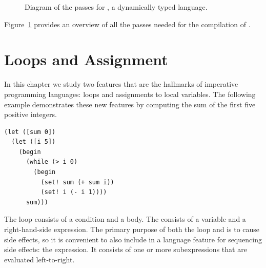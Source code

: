 \documentclass[11pt]{book}
\begin{document}
\begin{figure}[p]
  \caption{Diagram of the passes for \LangDyn{}, a dynamically typed language.}
\label{fig:Rdyn-passes}
\end{figure}

Figure~\ref{fig:Rdyn-passes} provides an overview of all the passes needed
for the compilation of \LangDyn{}.


\chapter{Loops and Assignment}
\label{ch:Rwhile}




In this chapter we study two features that are the hallmarks of
imperative programming languages: loops and assignments to local
variables. The following example demonstrates these new features by
computing the sum of the first five positive integers.
\begin{lstlisting}
(let ([sum 0])
  (let ([i 5])
    (begin
      (while (> i 0)
        (begin
          (set! sum (+ sum i))
          (set! i (- i 1))))
      sum)))
\end{lstlisting}
The  loop consists of a condition and a body.  
%
The  consists of a variable and a right-hand-side expression.
%
The primary purpose of both the  loop and   is
to cause side effects, so it is convenient to also include in a
language feature for sequencing side effects: the 
expression. It consists of one or more subexpressions that are
evaluated left-to-right.
\end{document}

